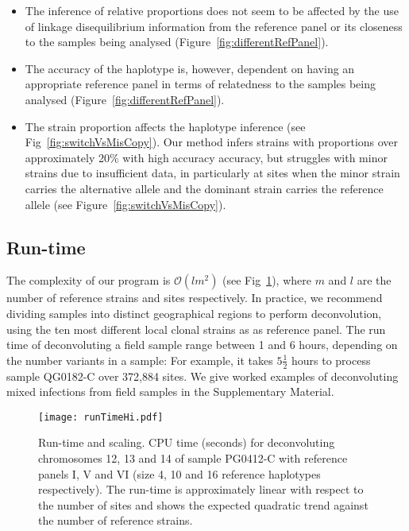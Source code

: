 \documentclass{bioinfo}
\begin{document}
\begin{itemize}

\item The inference of relative proportions does not seem to be affected by the use of linkage disequilibrium information from the reference panel or its closeness to the samples being analysed (Figure~\ref{fig:differentRefPanel}).

\item The accuracy of the haplotype is, however, dependent on having an appropriate reference panel in terms of relatedness to the samples being analysed (Figure~\ref{fig:differentRefPanel}).

\item The strain proportion affects the haplotype inference (see Fig~\ref{fig:switchVsMisCopy}). Our method infers strains with proportions over approximately 20\% with high accuracy  accuracy, but struggles with minor strains due to insufficient data, in particularly at sites when the minor strain carries the alternative allele and the dominant strain carries the reference allele (see Figure~\ref{fig:switchVsMisCopy}).

\end{itemize}




\subsection{Run-time}

The complexity of our program is $\mathcal{O}(lm^2)$ (see Fig~\ref{fig:runtime}), where $m$ and $l$ are the number of reference strains and sites respectively. In practice, we recommend dividing samples into distinct geographical regions to perform deconvolution, using the ten most different local clonal strains as as reference panel. The run time of deconvoluting a field sample range between 1 and 6 hours, depending on the number variants in a sample: For example, it takes $5\frac{1}{2}$ hours to process sample {\textmd QG0182-C} over 372,884 sites.  We give worked examples of deconvoluting mixed infections from field samples in the Supplementary Material.



\begin{figure}[htb]
\centering
\texttt{[image: runTimeHi.pdf]}
\caption{Run-time and scaling.  CPU time (seconds) for deconvoluting chromosomes 12, 13 and 14 of sample {\textmd PG0412-C} with reference panels I, V and VI (size 4, 10 and 16 reference haplotypes respectively). The run-time is approximately linear with respect to the number of sites and shows the expected quadratic trend against the number of reference strains.}\label{fig:runtime}
\end{figure}
\end{document}
